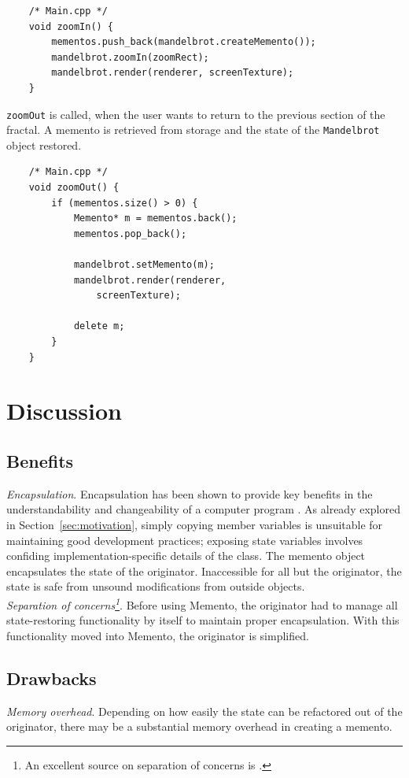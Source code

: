 \documentclass[11pt, a4paper, twoside]{article}
\begin{document}
	\begin{lstlisting}
	/* Main.cpp */
	void zoomIn() {
		mementos.push_back(mandelbrot.createMemento());
		mandelbrot.zoomIn(zoomRect);
		mandelbrot.render(renderer, screenTexture);
	}
	\end{lstlisting}
	
	\verb|zoomOut| is called, when the user wants to return to the previous section of the fractal. A memento is retrieved from storage and the state of the \verb|Mandelbrot| object restored.
	
	\begin{lstlisting}
	/* Main.cpp */
	void zoomOut() {
		if (mementos.size() > 0) {
			Memento* m = mementos.back();
			mementos.pop_back();
			
			mandelbrot.setMemento(m);
			mandelbrot.render(renderer,
				screenTexture);
			
			delete m;
		}
	}
	\end{lstlisting}
	
	\section{Discussion}
	
	\subsection{Benefits}
	\label{sec:benefits}
	\emph{Encapsulation}. Encapsulation has been shown to provide key benefits in the understandability and changeability of a computer program \cite{snyder1986}. As already explored in Section~\ref{sec:motivation}, simply copying member variables is unsuitable for maintaining good development practices; exposing state variables involves confiding implementation-specific details of the class. The memento object encapsulates the state of the originator. Inaccessible for all but the originator, the state is safe from unsound modifications from outside objects. \\
	
	\noindent\emph{Separation of concerns\footnote{An excellent source on separation of concerns is \cite{Huersch95}.}}. Before using Memento, the originator had to manage all state-restoring functionality by itself to maintain proper encapsulation. With this functionality moved into Memento, the originator is simplified.
	
	\subsection{Drawbacks}
	\emph{Memory overhead}. Depending on how easily the state can be refactored out of the originator, there may be a substantial memory overhead in creating a memento. \\
	
\end{document}
